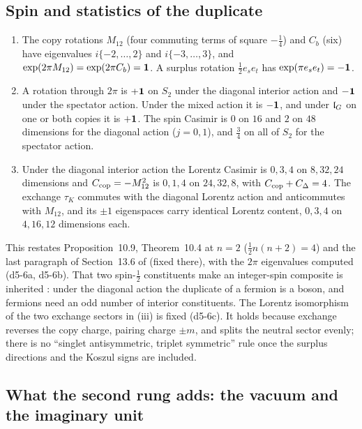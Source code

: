 \subsection{Spin and statistics of the duplicate}
\label{d5:sec:spin}

\begin{proposition}
\label{d5:prop:spin}
\begin{enumerate}[label=(\roman*),leftmargin=2.2em]
\item The copy rotations $M_{12}$ (four commuting terms of square $-\tfrac14$) and $C_b$ (six) have eigenvalues $i\{-2,\dots,2\}$ and $i\{-3,\dots,3\}$, and
$\exp(2\pi M_{12})=\exp(2\pi C_b)=\mathbf 1$. A surplus rotation $\tfrac12e_se_t$ has $\exp(\pi e_se_t)=-\mathbf 1$.
\item A rotation through $2\pi$ is $+\mathbf 1$ on $S_2$ under the diagonal interior action and $-\mathbf 1$ under the spectator action. Under the mixed action it
is $-\mathbf 1$, and under $\mathfrak l_G$ on one or both copies it is $+\mathbf 1$. The spin Casimir is $0$ on $16$ and $2$ on $48$ dimensions for the diagonal action
($j=0,1$), and $\tfrac34$ on all of $S_2$ for the spectator action.
\item Under the diagonal interior action the Lorentz Casimir is $0,3,4$ on $8,32,24$ dimensions and $C_{\rm cop}=-M_{12}^2$ is $0,1,4$ on $24,32,8$, with
$C_{\rm cop}+C_\Delta=4$. The exchange $\tau_K$ commutes with the diagonal Lorentz action and anticommutes with $M_{12}$, and its $\pm1$ eigenspaces
carry identical Lorentz content, $0,3,4$ on $4,16,12$ dimensions each.
\end{enumerate}
\end{proposition}

This restates Proposition~10.9, Theorem~10.4 at $n=2$ ($\tfrac12n(n+2)=4$) and the last paragraph of Section~13.6 of \cite{ES17} (fixed there),
with the $2\pi$ eigenvalues computed (d5-6a, d5-6b). That two spin-$\tfrac12$ constituents make an integer-spin composite is inherited
\cite{EhrenfestOppenheimer31}: under the diagonal action the duplicate of a fermion is a boson, and fermions need an odd number of interior
constituents. The Lorentz isomorphism of the two exchange sectors in (iii) is fixed (d5-6c). It holds because exchange reverses the copy
charge, pairing charge $\pm m$, and splits the neutral sector evenly; there is no ``singlet antisymmetric, triplet symmetric'' rule once the
surplus directions and the Koszul signs are included.

\subsection{What the second rung adds: the vacuum and the imaginary unit}
\label{d5:sec:vacuum}

